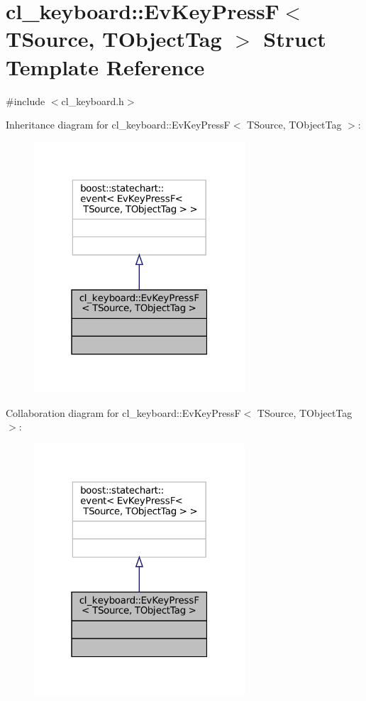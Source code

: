 \hypertarget{structcl__keyboard_1_1EvKeyPressF}{}\section{cl\+\_\+keyboard\+:\+:Ev\+Key\+PressF$<$ T\+Source, T\+Object\+Tag $>$ Struct Template Reference}
\label{structcl__keyboard_1_1EvKeyPressF}


{\ttfamily \#include $<$cl\+\_\+keyboard.\+h$>$}



Inheritance diagram for cl\+\_\+keyboard\+:\+:Ev\+Key\+PressF$<$ T\+Source, T\+Object\+Tag $>$\+:
\nopagebreak
\begin{figure}[H]
\begin{center}
\leavevmode
\includegraphics[width=223pt]{structcl__keyboard_1_1EvKeyPressF__inherit__graph}
\end{center}
\end{figure}


Collaboration diagram for cl\+\_\+keyboard\+:\+:Ev\+Key\+PressF$<$ T\+Source, T\+Object\+Tag $>$\+:
\nopagebreak
\begin{figure}[H]
\begin{center}
\leavevmode
\includegraphics[width=223pt]{structcl__keyboard_1_1EvKeyPressF__coll__graph}
\end{center}
\end{figure}



